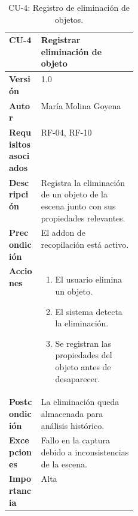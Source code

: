 \begin{table}[p]
\centering
\begin{tabularx}{\linewidth}{p{0.25\linewidth} X}
\toprule
\textbf{CU-4} & Registrar eliminación de objeto \\
\midrule
\textbf{Versión} & 1.0 \\
\textbf{Autor} & María Molina Goyena \\
\textbf{Requisitos asociados} & RF-04, RF-10 \\
\textbf{Descripción} & Registra la eliminación de un objeto de la escena junto con sus propiedades relevantes. \\
\textbf{Precondición} & El addon de recopilación está activo. \\
\textbf{Acciones} &
\begin{minipage}[t]{\linewidth}
\begin{enumerate}
    \item El usuario elimina un objeto.
    \item El sistema detecta la eliminación.
    \item Se registran las propiedades del objeto antes de desaparecer.
\end{enumerate}
\end{minipage} \\
\textbf{Postcondición} & La eliminación queda almacenada para análisis histórico. \\
\textbf{Excepciones} & Fallo en la captura debido a inconsistencias de la escena. \\
\textbf{Importancia} & Alta \\
\bottomrule
\end{tabularx}
\caption{CU-4: Registro de eliminación de objetos.}
\label{tab:cu4}
\end{table}

